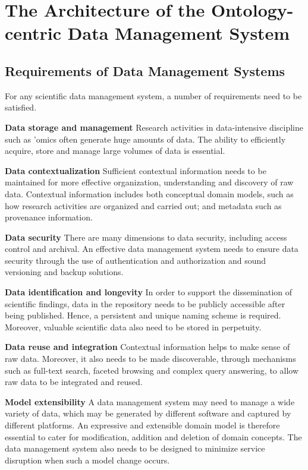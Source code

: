 \documentclass[conference,10pt]{IEEEtran}
\begin{document}
\section{The Architecture of the Ontology-centric Data Management System}\label{sec:arch}

\subsection{Requirements of Data Management Systems}

For any scientific data management system, a number of requirements need to be satisfied.

\begin{list}{}{\leftmargin=1em}
\item[\textbf{Data storage and management}] Research activities in data-intensive discipline such as 'omics often generate huge amounts of data. The ability to efficiently acquire, store and manage large volumes of data is essential.

\item[\textbf{Data contextualization}] Sufficient contextual information needs to be maintained for more effective organization, understanding and discovery of raw data. Contextual information includes both conceptual domain models, such as how research activities are organized and carried out; and metadata such as provenance information.

\item[\textbf{Data security}] There are many dimensions to data security, including access control and archival. An effective data management system needs to ensure data security through the use of authentication and authorization and sound versioning and backup solutions. 

\item[\textbf{Data identification and longevity}] In order to support the dissemination of scientific findings, data in the repository needs to be publicly accessible after being published. Hence, a persistent and unique naming scheme is required. Moreover, valuable scientific data also need to be stored in perpetuity.

\item[\textbf{Data reuse and integration}] Contextual information helps to make sense of raw data. Moreover, it also needs to be made discoverable, through mechanisms such as full-text search, faceted browsing and complex query answering, to allow raw data to be integrated and reused.

\item[\textbf{Model extensibility}] A data management system may need to manage a wide variety of data, which may be generated by different software and captured by different platforms. An expressive and extensible domain model is therefore essential to cater for modification, addition and deletion of domain concepts. The data management system also needs to be designed to minimize service disruption when such a model change occurs.
\end{list}
\end{document}
